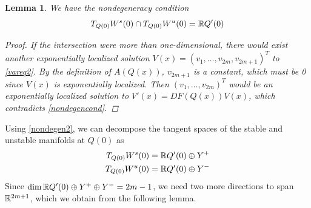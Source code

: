 \documentclass[10pt,reqno]{amsart}
\theoremstyle{plain}
\newtheorem{lemma}[theorem]{Lemma}
\theoremstyle{definition}
\theoremstyle{remark}
\numberwithin{theorem}{section}
\numberwithin{equation}{section}
\begin{document}
\begin{lemma}\label{nondegenlemma}
We have the nondegeneracy condition
\begin{equation}\label{nondegen2}
T_{Q(0)}W^s(0) \cap T_{Q(0)}W^u(0) = \mathbb{R} Q'(0)
\end{equation}
\begin{proof}
If the intersection were more than one-dimensional, there would exist another exponentially localized solution $V(x) = (v_1, \dots, v_{2m}, v_{2m+1})^T$ to \eqref{vareq2}. By the definition of $A(Q(x))$, $v_{2m+1}$ is a constant, which must be 0 since $V(x)$ is exponentially localized. Then $(v_1, \dots, v_{2m})^T$ would be an exponentially localized solution to $V'(x) = DF(Q(x)) V(x)$, which contradicts \eqref{nondegencond}.
\end{proof}
\end{lemma}

\noi Using \cref{nondegen2}, we can decompose the tangent spaces of the stable and unstable manifolds at $Q(0)$ as
\begin{equation}\label{TQ0decomp}
\begin{aligned}
T_{Q(0)}W^s(0) &= \mathbb{R} Q'(0) \oplus Y^+ \\
T_{Q(0)}W^u(0) &= \mathbb{R} Q'(0) \oplus Y^-
\end{aligned}
\end{equation}
Since $\mathop\mathrm{dim}\nolimits \mathbb{R} Q'(0) \oplus Y^+ \oplus Y^- = 2m-1$, we need two more directions to span $\mathbb{R}^{2m+1}$, which we obtain from the following lemma.
\end{document}
